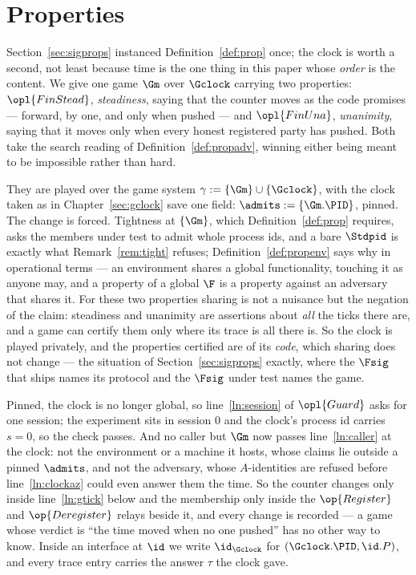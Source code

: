 \documentclass[10pt,oneside,openany]{book}
\theoremstyle{accentdef}
\theoremstyle{accentplain}
\begin{document}
\section{Properties}\label{sec:clockprops}

Section~\ref{sec:sigprops} instanced Definition~\ref{def:prop} once; the clock is worth a
second, not least because time is the one thing in this paper whose \emph{order} is the content.
We give one game $\Gm$ over $\Gclock$ carrying two properties: $\opl{FinStead}$,
\emph{steadiness}, saying that the counter
moves as the code promises --- forward, by one, and only when pushed --- and $\opl{FinUna}$,
\emph{unanimity}, saying that it moves only when every honest registered party has pushed. Both
take the search reading of Definition~\ref{def:propadv}, winning either being meant to be
impossible rather than hard.

They are played over the game system $\gamma := \{\Gm\} \cup \{\Gclock\}$, with the clock taken
as in Chapter~\ref{sec:gclock} save one field: $\admits := \{\Gm.\PID\}$, pinned. The change is
forced. Tightness at $\{\Gm\}$, which Definition~\ref{def:prop} requires, asks the members under
test to admit whole process ids, and a bare $\Stdpid$ is exactly what Remark~\ref{rem:tight}
refuses; Definition~\ref{def:propenv} says why in operational terms --- an environment shares a
global functionality, touching it as anyone may, and a property of a global $\F$ is a property
against an adversary that shares it. For these two properties sharing is not a nuisance but the
negation of the claim: steadiness and unanimity are assertions about \emph{all} the ticks there
are, and a game can certify them only where its trace is all there is. So the clock is played
privately, and the properties certified are of its \emph{code}, which sharing does not change ---
the situation of Section~\ref{sec:sigprops} exactly, where the $\Fsig$ that ships names its
protocol and the $\Fsig$ under test names the game.

Pinned, the clock is no longer global, so line~\ref{ln:session} of $\opl{Guard}$ asks for one
session; the experiment sits in session $0$ and the clock's process id carries $s = 0$, so the
check passes. And no caller but $\Gm$ now passes line~\ref{ln:caller} at the clock: not the
environment or a machine it hosts, whose claims lie outside a pinned $\admits$, and not the
adversary, whose $A$-identities are refused before line~\ref{ln:clockaz} could even answer them
the time. So the counter changes only inside line~\ref{ln:gtick} below and the membership only
inside the $\op{Register}$ and $\op{Deregister}$ relays beside it, and every change is
recorded --- a game whose verdict is ``the time moved when no one pushed'' has no other way to
know. Inside an interface at $\id$ we write $\id_{\Gclock}$ for $(\Gclock.\PID,\id.P)$, and every
trace entry carries the answer $\tau$ the clock gave.
\end{document}
